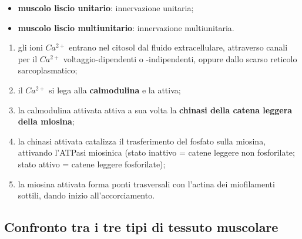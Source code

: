 \begin{itemize}
  \item \textbf{muscolo liscio unitario}: innervazione unitaria;
  \item \textbf{muscolo liscio multiunitario}: innervazione multiunitaria.
\end{itemize}

\begin{enumerate}
  \item gli ioni $Ca^{2+}$ entrano nel citosol dal fluido extracellulare, attraverso canali per il $Ca^{2+}$ voltaggio-dipendenti o -indipendenti, oppure dallo scarso reticolo sarcoplasmatico;
  \item il $Ca^{2+}$ si lega alla \textbf{calmodulina} e la attiva;
  \item la calmodulina attivata attiva a sua volta la \textbf{chinasi della catena leggera della miosina};
  \item la chinasi attivata catalizza il trasferimento del fosfato sulla miosina, attivando l'ATPasi miosinica (stato inattivo = catene leggere non fosforilate; stato attivo = catene leggere fosforilate);
  \item la miosina attivata forma ponti trasversali con l'actina dei miofilamenti sottili, dando inizio all'accorciamento.
\end{enumerate}

\subsection{Confronto tra i tre tipi di tessuto muscolare}

